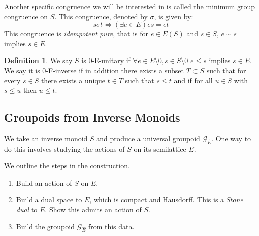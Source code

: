 \documentclass[11pt]{amsart}
\theoremstyle{plain}
\theoremstyle{definition}%
\newtheorem{definition}[theorem]{Definition}%
\theoremstyle{remark}%
\newcommand{\G}{\mathcal{G}}
\newcommand{\E}{\widehat{E}}
\begin{document}
Another specific congruence we will be interested in is called the minimum group congruence on $S$.  This congruence, denoted by $\sigma$, is given by:
\begin{equation*}
s \sigma t \Leftrightarrow (\exists e \in E) es = et
\end{equation*}
This congruence is \textit{idempotent pure}, that is for $e \in E(S)$ and $s \in S$, $e \sim s$ implies $s \in E$.

\begin{definition}
We say $S$ is 0-E-unitary if $\forall e \in E\setminus 0, s \in S \setminus 0$ $e \leq s$ implies $s \in E$. We say it is 0-F-inverse if in addition there exists a subset $T \subset S$ such that for every $s \in S$ there exists a unique $t \in T$ such that $s \leq t$ and if for all $u \in S$ with $s \leq u$ then $u \leq t$.
\end{definition}

\subsection{Groupoids from Inverse Monoids}
We take an inverse monoid $S$ and produce a universal groupoid $\G_{\E}$. One way to do this involves studying the actions of $S$ on its semilattice $E$.

We outline the steps in the construction.
\begin{enumerate}
\item Build an action of $S$ on $E$.
\item Build a dual space to $E$, which is compact and Hausdorff. This is a \textit{Stone dual} to $E$. Show this admits an action of $S$.
\item Build the groupoid $\G_{\E}$ from this data.
\end{enumerate}
\end{document}
